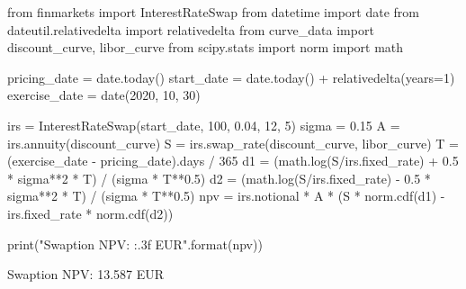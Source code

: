 \begin{solution}
\end{solution}

\begin{ipython}
from finmarkets import InterestRateSwap
from datetime import date
from dateutil.relativedelta import relativedelta
from curve_data import discount_curve, libor_curve
from scipy.stats import norm
import math

pricing_date = date.today()
start_date = date.today() + relativedelta(years=1)
exercise_date = date(2020, 10, 30)

irs = InterestRateSwap(start_date, 100, 0.04, 12, 5)
sigma = 0.15
A = irs.annuity(discount_curve)
S = irs.swap_rate(discount_curve, libor_curve)
T = (exercise_date - pricing_date).days / 365
d1 = (math.log(S/irs.fixed_rate) + 0.5 * sigma**2 * T) / (sigma * T**0.5)
d2 = (math.log(S/irs.fixed_rate) - 0.5 * sigma**2 * T) / (sigma * T**0.5)
npv = irs.notional * A * (S * norm.cdf(d1) - irs.fixed_rate * norm.cdf(d2))

print("Swaption NPV: {:.3f} EUR".format(npv))

Swaption NPV: 13.587 EUR
\end{ipython}
